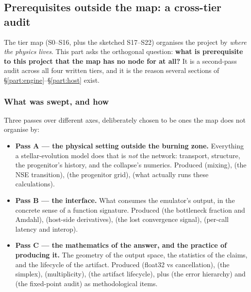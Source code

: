 \subsection{Prerequisites outside the map: a cross-tier audit}
\label{sec:boundaryaudit}

The tier map (S0--S16, plus the sketched S17--S22) organises the project by
\emph{where the physics lives}. This part asks the orthogonal question:
\textbf{what is prerequisite to this project that the map has no node for at
all?} It is a second-pass audit across all four written tiers, and it is the
reason several sections of \S\ref{part:engine}--\S\ref{part:host} exist.

\subsubsection{What was swept, and how}
\label{sec:swept}

Three passes over different axes, deliberately chosen to be ones the map does not
organise by:

\begin{itemize}
\item \textbf{Pass A --- the physical setting outside the burning zone.}
  Everything a stellar-evolution model does that is \emph{not} the network:
  transport, structure, the progenitor's history, and the collapse's numerics.
  Produced  (mixing),  (the NSE transition), 
  (the progenitor grid),  (what actually runs these calculations).
\item \textbf{Pass B --- the interface.} What consumes the emulator's output, in
  the concrete sense of a function signature. Produced  (the
  bottleneck fraction and Amdahl),  (host-side derivatives),
   (the lost convergence signal),  (per-call latency and
  interop).
\item \textbf{Pass C --- the mathematics of the answer, and the practice of
  producing it.} The geometry of the output space, the statistics of the
  claims, and the lifecycle of the artifact. Produced  (float32 vs
  cancellation),  (the simplex),  (multiplicity),
   (the artifact lifecycle), plus  (the error hierarchy)
  and  (the fixed-point audit) as methodological items.
\end{itemize}


